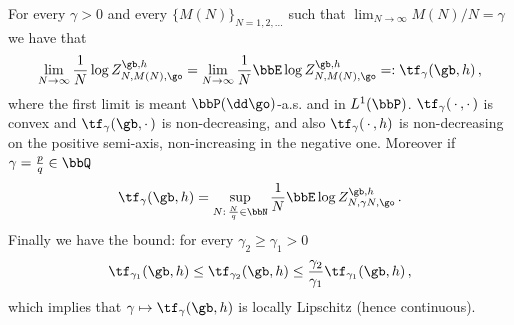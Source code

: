 \begin{prop}\label{th:existence+}
For every $\gamma>0$ and every $\{M(N)\}_{N=1,2, \ldots}$ such that $\lim_{N \to \infty} M(N)/N=\gamma$ we have that
\begin{equation}\label{eq:existence+.1}
\lim_{N \to \infty} \frac{1}{N} \log Z_{N,M(N), \go}^{\gb,h}= \lim_{N \to \infty}
\frac{1}{N} \bbE \log Z_{N,M(N), \go}^{\gb,h} =: \tf_\gamma(\gb, h)\,,
\end{equation}
where the first limit is meant $\bbP(\dd \go)$-a.s. and in $L^1 (\bbP)$. $\tf_\gamma ({\,\cdot\,,\cdot\,})$ is convex and $\tf_\gamma ({\gb,\cdot\,})$ is non-decreasing, and also $\tf_\gamma ({\,\cdot\,,h})$ is non-decreasing on the positive semi-axis, non-increasing in the negative one. Moreover if $\gamma=\frac{p}{q}\in \bbQ$
\begin{equation}\label{eq:existence+.2}
\tf_\gamma (\gb, h) = \sup_{N:\,\frac{N}{q}\in \bbN} \frac{1}{N} \bbE \log Z_{N, \gamma N, \go}^{\gb,h}\,.
\end{equation}
Finally we have the bound: for every $\gamma_2\ge \gamma_1 >0$
\begin{equation}\label{eq:existence+.3}
\tf_{\gamma_1}(\gb, h) \le \tf_{\gamma_2}(\gb, h)\le \frac{\gamma_2}{\gamma_1} \tf_{\gamma_1}(\gb, h)\,,
\end{equation}
which implies that $\gamma \mapsto \tf_{\gamma}(\gb, h)$ is locally Lipschitz (hence continuous).
\end{prop}

